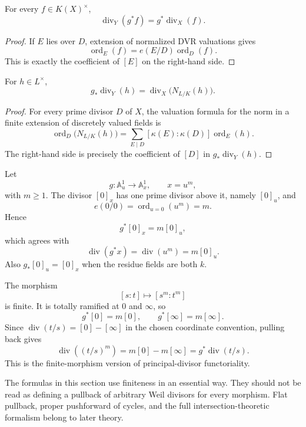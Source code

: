 \begin{proposition}\label{prop:vi39-finite-pullback-principal}
For every \(f\in K(X)^\times\),
\[
 \operatorname{div}_Y(g^*f)=g^*\operatorname{div}_X(f).
\]
\end{proposition}

\begin{proof}
If \(E\) lies over \(D\), extension of normalized DVR valuations gives
\[
 \operatorname{ord}_E(f)=e(E/D)\operatorname{ord}_D(f).
\]
This is exactly the coefficient of \([E]\) on the right-hand side.
\end{proof}

\begin{proposition}\label{prop:vi39-finite-pushforward-norm}
For \(h\in L^\times\),
\[
 g_*\operatorname{div}_Y(h)
 =\operatorname{div}_X\!\bigl(N_{L/K}(h)\bigr).
\]
\end{proposition}

\begin{proof}
For every prime divisor \(D\) of \(X\), the valuation formula for the norm in a finite extension of discretely valued fields is
\[
 \operatorname{ord}_D\!\bigl(N_{L/K}(h)\bigr)
 =\sum_{E\mid D}[\kappa(E):\kappa(D)]\operatorname{ord}_E(h).
\]
The right-hand side is precisely the coefficient of \([D]\) in \(g_*\operatorname{div}_Y(h)\).
\end{proof}

\begin{example}\label{ex:vi39-power-map-affine}
Let
\[
 g:\mathbb A^1_u\longrightarrow\mathbb A^1_x,
 \qquad x=u^m,
\]
with \(m\ge1\).  The divisor \([0]_x\) has one prime divisor above it, namely \([0]_u\), and
\[
 e(0/0)=\operatorname{ord}_{u=0}(u^m)=m.
\]
Hence
\[
 g^*[0]_x=m[0]_u,
\]
which agrees with
\[
 \operatorname{div}(g^*x)=\operatorname{div}(u^m)=m[0]_u.
\]
Also \(g_*[0]_u=[0]_x\) when the residue fields are both \(k\).
\end{example}

\begin{example}\label{ex:vi39-power-map-projective}
The morphism
\[
 [s:t]\longmapsto[s^m:t^m]
\]
is finite.  It is totally ramified at \(0\) and \(\infty\), so
\[
 g^*[0]=m[0],\qquad g^*[\infty]=m[\infty].
\]
Since \(\operatorname{div}(t/s)=[0]-[\infty]\) in the chosen coordinate convention, pulling back gives
\[
 \operatorname{div}\!\left((t/s)^m\right)
 =m[0]-m[\infty]
 =g^*\operatorname{div}(t/s).
\]
This is the finite-morphism version of principal-divisor functoriality.
\end{example}

\begin{warning}\label{warn:vi39-finite-scope}
The formulas in this section use finiteness in an essential way.  They should not be read as defining a pullback of arbitrary Weil divisors for every morphism.  Flat pullback, proper pushforward of cycles, and the full intersection-theoretic formalism belong to later theory.
\end{warning}
